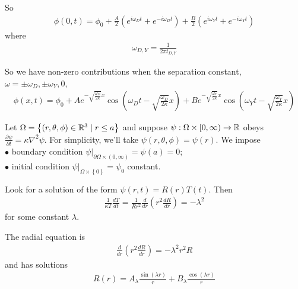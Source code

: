 \documentclass[a4paper]{article}
\begin{document}
So
\begin{equation*}
\begin{aligned}
\phi\left(0,t\right) = \phi_0 + \frac{A}{2}\left(e^{i\omega_D t} + e^{-i\omega_D t}\right) + \frac{B}{2}\left(e^{i\omega_Y t} + e^{-i\omega_Y t}\right)
\end{aligned}
\end{equation*}
where
\begin{equation*}
\begin{aligned}
\omega_{D,Y} = \frac{1}{2\pi t_{D,Y}}
\end{aligned}
\end{equation*}

So we have non-zero contributions when the separation constant, $\omega = \pm \omega_D,\pm\omega_Y,0$,
\begin{equation*}
\begin{aligned}
\phi\left(x,t\right) = \phi_0 + Ae^{-\sqrt{\frac{\omega_D}{2\kappa}}x} \cos\left(\omega_D t-\sqrt{\frac{\omega_D}{2\kappa}} x\right) + Be^{-\sqrt{\frac{\omega_Y}{2\kappa}}x} \cos\left(\omega_Y t-\sqrt{\frac{\omega_Y}{2\kappa}} x\right)
\end{aligned}
\end{equation*}

Let $\Omega = \left\{\left(r,\theta,\phi\right) \in \mathbb{R}^3 \mid r \leq a \right\}$ and suppose $\psi:\Omega \times \left[0,\infty\right) \to \mathbb{R}$ obeys $\frac{\partial \psi}{\partial t} = \kappa \nabla^2 \psi$. For simplicity, we'll take $\psi\left(r,\theta,\phi\right) = \psi\left(r\right)$. We impose\\
$\bullet$ boundary condition $\psi|_{\partial \Omega \times \left(0,\infty\right)} = \psi\left(a\right) = 0$;\\
$\bullet$ initial condition $\psi|_{\Omega\times\left\{0\right\}} = \psi_0$ constant.

Look for a solution of the form $\psi\left(r,t\right) = R\left(r\right) T\left(t\right)$. Then
\begin{equation*}
\begin{aligned}
\frac{1}{\kappa T} \frac{dT}{dt} = \frac{1}{Rr^2} \frac{d}{dr}\left(r^2 \frac{dR}{dr}\right) = -\lambda^2
\end{aligned}
\end{equation*}
for some constant $\lambda$.

The radial equation is
\begin{equation*}
\begin{aligned}
\frac{d}{dr}\left(r^2 \frac{dR}{dr}\right) = -\lambda^2 r^2 R
\end{aligned}
\end{equation*}
and has solutions
\begin{equation*}
\begin{aligned}
R\left(r\right) = A_\lambda \frac{\sin\left(\lambda r\right)}{r} + B_\lambda \frac{\cos\left(\lambda r\right)}{r}
\end{aligned}
\end{equation*}
\end{document}
